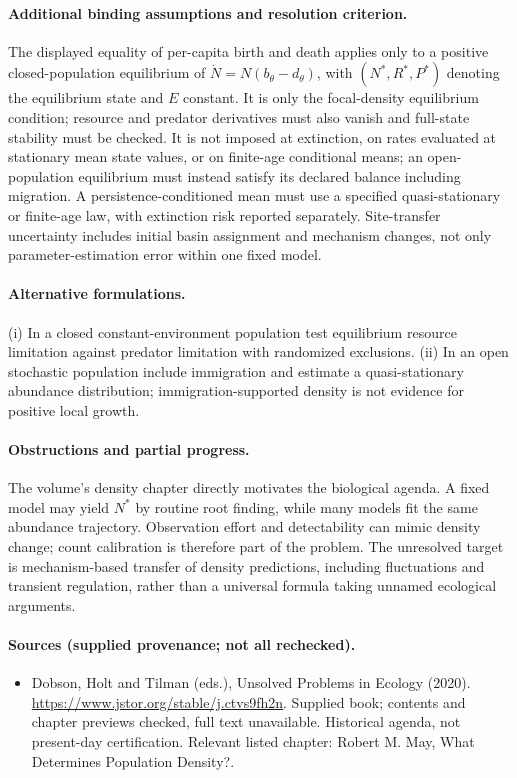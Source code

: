 \documentclass[11pt]{article}
\begin{document}
\paragraph{Additional binding assumptions and resolution criterion.} The displayed equality of per-capita birth and death applies only to a positive closed-population equilibrium of $\dot N=N(b_\theta-d_\theta)$, with $(N^*,R^*,P^*)$ denoting the equilibrium state and $E$ constant. It is only the focal-density equilibrium condition; resource and predator derivatives must also vanish and full-state stability must be checked. It is not imposed at extinction, on rates evaluated at stationary mean state values, or on finite-age conditional means; an open-population equilibrium must instead satisfy its declared balance including migration. A persistence-conditioned mean must use a specified quasi-stationary or finite-age law, with extinction risk reported separately. Site-transfer uncertainty includes initial basin assignment and mechanism changes, not only parameter-estimation error within one fixed model.

\paragraph{Alternative formulations.} (i) In a closed constant-environment population test equilibrium resource limitation against predator limitation with randomized exclusions. (ii) In an open stochastic population include immigration and estimate a quasi-stationary abundance distribution; immigration-supported density is not evidence for positive local growth.
\paragraph{Obstructions and partial progress.} The volume's density chapter directly motivates the biological agenda. A fixed model may yield $N^*$ by routine root finding, while many models fit the same abundance trajectory. Observation effort and detectability can mimic density change; count calibration is therefore part of the problem. The unresolved target is mechanism-based transfer of density predictions, including fluctuations and transient regulation, rather than a universal formula taking unnamed ecological arguments.
\paragraph{Sources (supplied provenance; not all rechecked).}
\begin{itemize}
\item Dobson, Holt and Tilman (eds.), Unsolved Problems in Ecology (2020). \url{https://www.jstor.org/stable/j.ctvs9fh2n}. Supplied book; contents and chapter previews checked, full text unavailable. Historical agenda, not present-day certification. Relevant listed chapter: Robert M. May, What Determines Population Density?.
\end{itemize}
\end{document}
